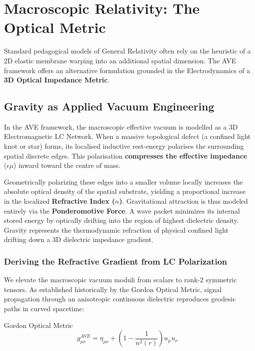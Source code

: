 \chapter{Macroscopic Relativity: The Optical Metric}
\label{ch:relativity}

Standard pedagogical models of General Relativity often rely on the heuristic of a 2D elastic membrane warping into an additional spatial dimension. The AVE framework offers an alternative formulation grounded in the Electrodynamics of a \textbf{3D Optical Impedance Metric}.

\section{Gravity as Applied Vacuum Engineering}
In the AVE framework, the macroscopic effective vacuum is modelled as a 3D Electromagnetic LC Network. When a massive topological defect (a confined light knot or star) forms, its localised inductive rest-energy polarises the surrounding spatial discrete edges. This polarisation \textbf{compresses the effective impedance} ($\epsilon\mu$) inward toward the centre of mass.

Geometrically polarizing these edges into a smaller volume locally increases the absolute optical density of the spatial substrate, yielding a proportional increase in the localized \textbf{Refractive Index ($n$)}. Gravitational attraction is thus modeled entirely via the \textbf{Ponderomotive Force}. A wave packet minimizes its internal stored energy by optically drifting into the region of highest dielectric density. Gravity represents the thermodynamic refraction of physical confined light drifting down a 3D dielectric impedance gradient.

\subsection{Deriving the Refractive Gradient from LC Polarization}

We elevate the macroscopic vacuum moduli from scalars to rank-2 symmetric tensors. As
established historically by the Gordon Optical Metric, signal propagation through an
anisotropic continuous dielectric reproduces geodesic paths in curved spacetime:

\begin{resultbox}{Gordon Optical Metric}
\begin{equation}
g_{\mu\nu}^{AVE}=\eta_{\mu\nu}+\left(1-\frac{1}{n^{2}(r)}\right)u_{\mu}u_{\nu}
\end{equation}
\end{resultbox}

